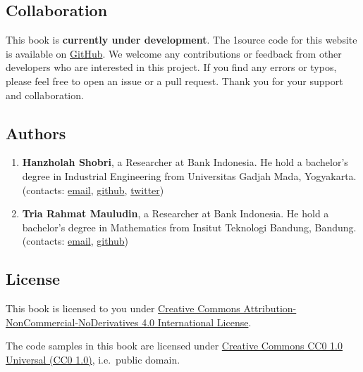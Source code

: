 \documentclass[
  letterpaper,
  DIV=11,
  numbers=noendperiod]{scrreprt}
\begin{document}
\hypertarget{collaboration}{%
\subsection*{Collaboration}\label{collaboration}}

This book is \textbf{currently under development}. The 1source code for
this website is available on
\href{https://github.com/hanzholahs/tensorflow-for-deep-learning}{GitHub}.
We welcome any contributions or feedback from other developers who are
interested in this project. If you find any errors or typos, please feel
free to open an issue or a pull request. Thank you for your support and
collaboration.

\hypertarget{authors}{%
\subsection*{Authors}\label{authors}}

\begin{enumerate}
\def\labelenumi{\arabic{enumi}.}
\item
  \textbf{Hanzholah Shobri}, a Researcher at Bank Indonesia. He hold a
  bachelor's degree in Industrial Engineering from Universitas Gadjah
  Mada, Yogyakarta. (contacts:
  \href{mailto:hanzholahs@gmail.com}{email},
  \href{https://github.com/hanzholahs}{github},
  \href{https://twitter.com/hanzholah}{twitter})
\item
  \textbf{Tria Rahmat Mauludin}, a Researcher at Bank Indonesia. He hold
  a bachelor's degree in Mathematics from Insitut Teknologi Bandung,
  Bandung. (contacts: \href{mailto:triarahmatm@gmail.com}{email},
  \href{https://github.com/triarm}{github})
\end{enumerate}

\hypertarget{license}{%
\subsection*{License}\label{license}}

This book is licensed to you under
\href{https://creativecommons.org/licenses/by-nc-nd/4.0/}{Creative
Commons Attribution-NonCommercial-NoDerivatives 4.0 International
License}.

The code samples in this book are licensed under
\href{https://creativecommons.org/publicdomain/zero/1.0/}{Creative
Commons CC0 1.0 Universal (CC0 1.0)}, i.e.~public domain.
\end{document}
